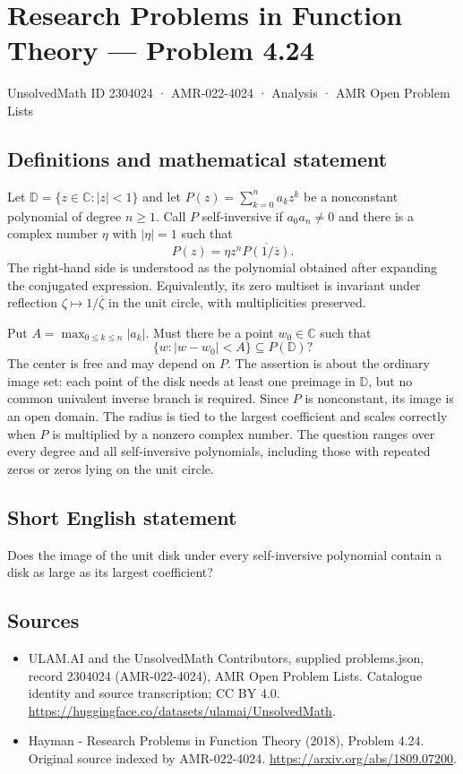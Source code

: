 \documentclass[11pt,a4paper]{article}
\begin{document}
\section*{Research Problems in Function Theory — Problem 4.24}\label{2304024}
{\small UnsolvedMath ID 2304024 · AMR-022-4024 · Analysis · AMR Open Problem Lists}
\subsection{Definitions and mathematical statement}
Let $\mathbb D=\{z\in\mathbb C:|z|<1\}$ and let
$P(z)=\sum_{k=0}^{n}a_kz^k$ be a nonconstant polynomial of degree
$n\geq1$. Call $P$ self-inversive if $a_0a_n\ne0$ and there is a
complex number $\eta$ with $|\eta|=1$ such that
\[
 P(z)=\eta z^n\overline{P(1/\overline z)}.
\]
The right-hand side is understood as the polynomial obtained after
expanding the conjugated expression. Equivalently, its zero multiset
is invariant under reflection $\zeta\mapsto1/\overline\zeta$ in the
unit circle, with multiplicities preserved.

Put $A=\max_{0\leq k\leq n}|a_k|$. Must there be a point $w_0\in
\mathbb C$ such that
\[
 \{w:|w-w_0|<A\}\subseteq P(\mathbb D)?
\]
The center is free and may depend on $P$. The assertion is about
the ordinary image set: each point of the disk needs at least one
preimage in $\mathbb D$, but no common univalent inverse branch is
required. Since $P$ is nonconstant, its image is an open domain.
The radius is tied to the largest coefficient and scales correctly
when $P$ is multiplied by a nonzero complex number.
The question ranges over every degree and all self-inversive
polynomials, including those with repeated zeros or zeros lying
on the unit circle.
\subsection{Short English statement}
Does the image of the unit disk under every self-inversive polynomial contain a disk as large as its largest coefficient?
\subsection{Sources}
\begin{itemize}
\item[S1] ULAM.AI and the UnsolvedMath Contributors, supplied problems.json, record 2304024 (AMR-022-4024), AMR Open Problem Lists. Catalogue identity and source transcription; CC BY 4.0.
\url{https://huggingface.co/datasets/ulamai/UnsolvedMath}.
\item[S2] Hayman - Research Problems in Function Theory (2018), Problem 4.24. Original source indexed by AMR-022-4024.
\url{https://arxiv.org/abs/1809.07200}.
\end{itemize}
\end{document}
